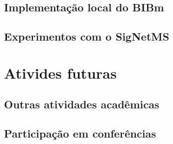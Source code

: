 \documentclass[12pt]{article}
\begin{document}
\subsection{Implementação local do BIBm}

\subsection{Experimentos com o SigNetMS}


\section{Ativides futuras}

\subsection{Outras atividades acadêmicas}

\subsection{Participação em conferências}


 

\end{document}
